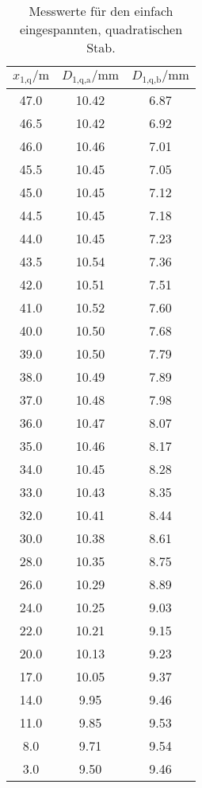 \begin{table}[h]
  \centering
  \caption{Messwerte für den einfach eingespannten, quadratischen Stab.}
  \label{tab:Quadein}
  \begin{tabular}{c c c}
    \toprule
    $x_\text{1,q}/\si{\meter}$ & $D_\text{1,q,a}/\si{\milli\meter}$ &
    $D_\text{1,q,b}/\si{\milli\meter}$ \\
    \midrule
    47.0 & 10.42 & 6.87 \\
    46.5 & 10.42 & 6.92 \\
    46.0 & 10.46 & 7.01 \\
    45.5 & 10.45 & 7.05 \\
    45.0 & 10.45 & 7.12 \\
    44.5 & 10.45 & 7.18 \\
    44.0 & 10.45 & 7.23 \\
    43.5 & 10.54 & 7.36 \\
    42.0 & 10.51 & 7.51 \\
    41.0 & 10.52 & 7.60 \\
    40.0 & 10.50 & 7.68 \\
    39.0 & 10.50 & 7.79 \\
    38.0 & 10.49 & 7.89 \\
    37.0 & 10.48 & 7.98 \\
    36.0 & 10.47 & 8.07 \\
    35.0 & 10.46 & 8.17 \\
    34.0 & 10.45 & 8.28 \\
    33.0 & 10.43 & 8.35 \\
    32.0 & 10.41 & 8.44 \\
    30.0 & 10.38 & 8.61 \\
    28.0 & 10.35 & 8.75 \\
    26.0 & 10.29 & 8.89 \\
    24.0 & 10.25 & 9.03 \\
    22.0 & 10.21 & 9.15 \\
    20.0 & 10.13 & 9.23 \\
    17.0 & 10.05 & 9.37 \\
    14.0 & 9.95 & 9.46 \\
    11.0 & 9.85 & 9.53 \\
    8.0 & 9.71 & 9.54 \\
    3.0 & 9.50 & 9.46 \\
    \bottomrule
  \end{tabular}
\end{table}

